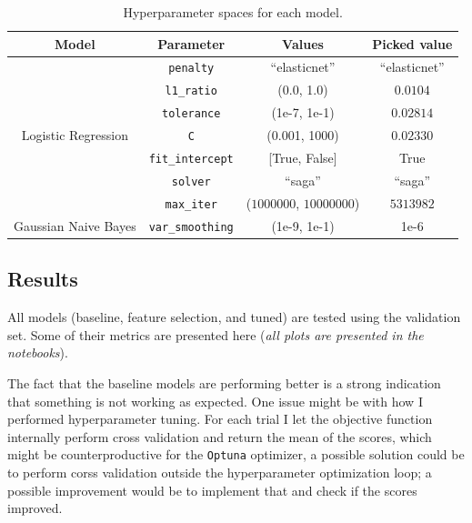 \documentclass[12pt]{article}
\begin{document}
\begin{table}[H]
    \centering
    \begin{tabular}{|c|c|c|c|}
        \hline
        \textbf{Model} & \textbf{Parameter} & \textbf{Values} & \textbf{Picked value} \\
        \hline
        \multirow{7}{*}{Logistic Regression}
            & \texttt{penalty} & ``elasticnet'' & ``elasticnet'' \\
            & \texttt{l1\_ratio} & (0.0, 1.0) & $0.0104$ \\
            & \texttt{tolerance} & (1e-7, 1e-1) & $0.02814$ \\
            & \texttt{C} & (0.001, 1000) & $0.02330$ \\
            & \texttt{fit\_intercept} & [True, False] & True \\
            & \texttt{solver} & ``saga'' & ``saga'' \\
            & \texttt{max\_iter} & ($1000000$, $10000000$) & $5313982$ \\
        \hline
        \multirow{1}{*}{Gaussian Naive Bayes}
            & \texttt{var\_smoothing} & (1e-9, 1e-1) & 1e-6 \\
        \hline
    \end{tabular}
    \caption{Hyperparameter spaces for each model.}
    \label{tab:hyperparams_classif}
\end{table}

\subsection{Results}

All models (baseline, feature selection, and tuned) are tested using the validation
set. Some of their metrics are presented here (\textit{all plots are presented in
the notebooks}).

The fact that the baseline models are performing better is a strong indication that
something is not working as expected. One issue might be with how I performed
hyperparameter tuning. For each trial I let the objective function internally
perform cross validation and return the mean of the scores, which might be
counterproductive for the \texttt{Optuna} optimizer, a possible solution could be
to perform corss validation outside the hyperparameter optimization loop; a possible
improvement would be to implement that and check if the scores improved.
\end{document}
